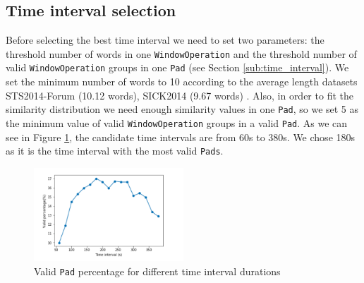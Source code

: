 \subsection{Time interval selection}
Before selecting the best time interval we need to set two parameters: the threshold number of words in one \texttt{WindowOperation} and the threshold number of valid \texttt{WindowOperation} groups in one \texttt{Pad} (see Section \ref{sub:time_interval}). We set the minimum number of words to 10 according to the average length datasets STS2014-Forum (10.12 words), SICK2014 (9.67 words) \cite{sen2vec}. Also, in order to fit the similarity distribution we need enough similarity values in one \texttt{Pad}, so we set 5 as the minimum value of valid \texttt{WindowOperation} groups in a valid \texttt{Pad}. 
As we can see in Figure \ref{TimeInterval}, the candidate time intervals are from 60s to 380s. We chose 180s as it is the time interval with the most valid \texttt{Pads}.
\begin{figure}[htp]
    \centering
    \includegraphics[width=0.5\textwidth]{figures/select_time_interval.png}
    \caption{Valid \texttt{Pad} percentage for different time interval durations}
    \label{TimeInterval}
\end{figure}


